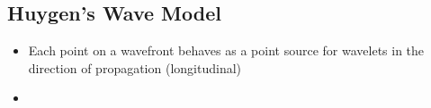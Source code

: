 	\subsection{Huygen's Wave Model}
	
		\begin{itemize}
			\item Each point on a wavefront behaves as a point source for wavelets in the direction of propagation (longitudinal)
			\item 
		\end{itemize}


